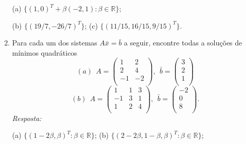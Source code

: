 \documentclass[10pt]{article}
\theoremstyle{plain}
\theoremstyle{obs}
\numberwithin{equation}{section}
\begin{document}
\begin{enumerate}
 (a) $\{(1,0)^{T}+\beta(-2,1): \beta \in \mathbb{R}\}$;
 
 (b) $\{(19/7,-26/7)^{T}\}$; (c) $\{(11/15, 16/15, 9/15)^{T}\}$.
 
 \item Para cada um dos sistemas $A\bar{x}=\bar{b}$ a seguir, 
 encontre todas a soluções de mínimos quadráticos
 $$
(a) \ \ 
A
=\begin{pmatrix}
1 & 2  \\%
2 & 4  \\
-1 & -2 \\
\end{pmatrix}, \ \ 
\bar{b}=
\begin{pmatrix}
3 \\
2 \\
1 \\
\end{pmatrix}$$
$$
(b) \ \ 
A=
\begin{pmatrix}
1 & 1 & 3 \\%
-1 & 3 & 1 \\
1 & 2 & 4 \\
\end{pmatrix}, \ \ 
\bar{b}=\begin{pmatrix}
-2 \\
0 \\
8 \\
\end{pmatrix}.
 $$ 
 {\it Resposta: } 
 
 (a) $\{(1-2\beta, \beta)^{T}: \beta \in \mathbb{R}\}$; 
 (b) $\{(2-2\beta, 1-\beta, \beta)^{T}: \beta \in \mathbb{R}\}$;
 \end{enumerate}
 
\end{document}
